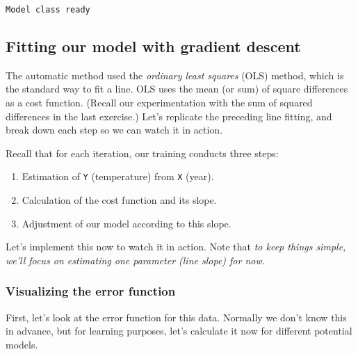 \documentclass[11pt]{article}
\begin{document}
    \begin{Verbatim}[commandchars=\\\{\}]
Model class ready
    \end{Verbatim}

    \hypertarget{fitting-our-model-with-gradient-descent}{%
\subsection{Fitting our model with gradient
descent}\label{fitting-our-model-with-gradient-descent}}

The automatic method used the \emph{ordinary least squares} (OLS)
method, which is the standard way to fit a line. OLS uses the mean (or
sum) of square differences as a cost function. (Recall our
experimentation with the sum of squared differences in the last
exercise.) Let's replicate the preceding line fitting, and break down
each step so we can watch it in action.

Recall that for each iteration, our training conducts three steps:

\begin{enumerate}
\def\labelenumi{\arabic{enumi}.}
\item
  Estimation of \texttt{Y} (temperature) from \texttt{X} (year).
\item
  Calculation of the cost function and its slope.
\item
  Adjustment of our model according to this slope.
\end{enumerate}

Let's implement this now to watch it in action. Note that \emph{to keep
things simple, we'll focus on estimating one parameter (line slope) for
now}.

\hypertarget{visualizing-the-error-function}{%
\subsubsection{Visualizing the error
function}\label{visualizing-the-error-function}}

First, let's look at the error function for this data. Normally we don't
know this in advance, but for learning purposes, let's calculate it now
for different potential models.
\end{document}
